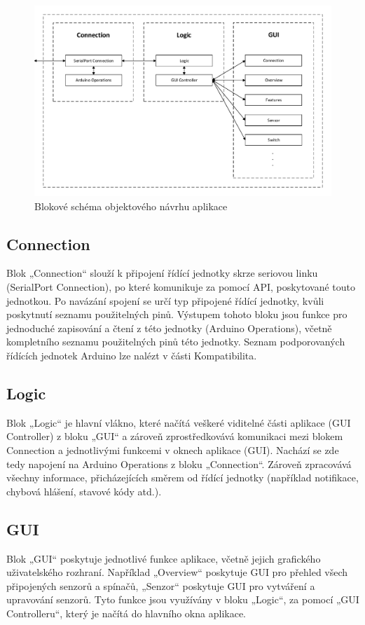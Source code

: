 \documentclass[FM,DP]{tulthesis}  %
\begin{document}
\begin{figure}[H]
\begin{center}
\includegraphics[width=\textwidth]{vector/blokoveSchemaSecurityControl.pdf}
\caption{Blokové schéma objektového návrhu aplikace}
\label{image}
\end{center}
\end{figure}

\subsection{Connection}
Blok „Connection“ slouží k připojení řídící jednotky skrze seriovou linku (SerialPort Connection), po které komunikuje za pomocí API, poskytované touto jednotkou. Po navázání spojení se určí typ připojené řídící jednotky, kvůli poskytnutí seznamu použitelných pinů. Výstupem tohoto bloku jsou funkce pro jednoduché zapisování a čtení z této jednotky (Arduino Operations), včetně kompletního seznamu použitelných pinů této jednotky. Seznam podporovaných řídících jednotek Arduino lze nalézt v části Kompatibilita.

\subsection{Logic}
Blok „Logic“ je hlavní vlákno, které načítá veškeré viditelné části aplikace (GUI Controller) z bloku „GUI“ a zároveň zprostředkovává komunikaci mezi blokem Connection a jednotlivými funkcemi v oknech aplikace (GUI). Nachází se zde tedy napojení na Arduino Operations z bloku „Connection“. Zároveň zpracovává všechny informace, přicházejících směrem od řídící jednotky (například notifikace, chybová hlášení, stavové kódy atd.).

\subsection{GUI}
Blok „GUI“ poskytuje jednotlivé funkce aplikace, včetně jejich grafického uživatelského rozhraní. Například „Overview“ poskytuje GUI pro přehled všech připojených senzorů a spínačů, „Senzor“ poskytuje GUI pro vytváření a upravování senzorů. Tyto funkce jsou využívány v bloku „Logic“, za pomocí „GUI Controlleru“, který je načítá do hlavního okna aplikace.
\end{document}
